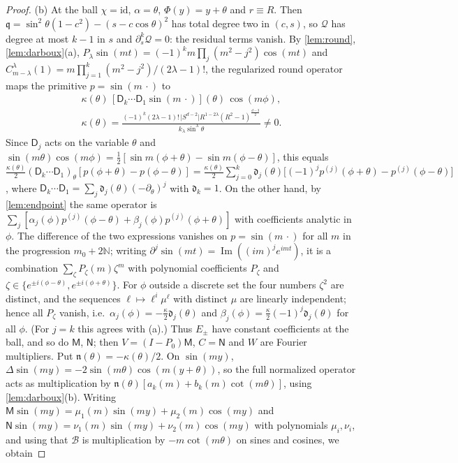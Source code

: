 \documentclass[11pt]{amsart}
\numberwithin{equation}{section}
\theoremstyle{definition}
\theoremstyle{remark}
\newcommand{\N}{\mathbb{N}}
\newcommand{\abs}[1]{\lvert #1\rvert}
\newcommand{\id}{\mathrm{id}}
\newcommand{\cB}{\mathcal B}
\begin{document}
\begin{proof}
(b) At the ball $\chi=\id$, $\alpha=\theta$, $\Phi(y)=y+\theta$ and $r\equiv R$. Then $\mathfrak q=\sin^2\theta(1-c^2)-(s-c\cos\theta)^2$ has total degree two in $(c,s)$, so $\mathcal Q$ has degree at most $k-1$ in $s$ and $\partial_s^k\mathcal Q=0$: the residual terms vanish. By \cref{lem:round}, \cref{lem:darboux}(a), $P_\lambda\sin(mt)=(-1)^km\prod_j(m^2-j^2)\cos(mt)$ and $C^\lambda_{m-\lambda}(1)=m\prod_{j=1}^k(m^2-j^2)/(2\lambda-1)!$, the regularized round operator maps the primitive $p=\sin(m\,\cdot)$ to
\begin{gather*}
\kappa(\theta)\,[\mathsf D_k\cdots\mathsf D_1\sin(m\,\cdot)](\theta)\,\cos(m\phi),\\
\kappa(\theta)=\frac{(-1)^k(2\lambda-1)!\,\abs{S^{d-2}}R^{1-2\lambda}(R^2-1)^{\frac{d-3}2}}{k_\lambda\sin^\lambda\theta}\ne0 .
\end{gather*}
Since $\mathsf D_j$ acts on the variable $\theta$ and $\sin(m\theta)\cos(m\phi)=\frac12[\sin m(\phi+\theta)-\sin m(\phi-\theta)]$, this equals $\frac{\kappa(\theta)}2(\mathsf D_k\cdots\mathsf D_1)_\theta[p(\phi+\theta)-p(\phi-\theta)]=\frac{\kappa(\theta)}2\sum_{j=0}^k\mathfrak d_j(\theta)\bigl[(-1)^jp^{(j)}(\phi+\theta)-p^{(j)}(\phi-\theta)\bigr]$, where $\mathsf D_k\cdots\mathsf D_1=\sum_j\mathfrak d_j(\theta)(-\partial_\theta)^j$ with $\mathfrak d_k=1$. On the other hand, by \cref{lem:endpoint} the same operator is $\sum_j[\alpha_j(\phi)p^{(j)}(\phi-\theta)+\beta_j(\phi)p^{(j)}(\phi+\theta)]$ with coefficients analytic in $\phi$. The difference of the two expressions vanishes on $p=\sin(m\,\cdot)$ for all $m$ in the progression $m_0+2\N$; writing $\partial^j\sin(mt)=\operatorname{Im}((im)^je^{imt})$, it is a combination $\sum_\zeta P_\zeta(m)\zeta^m$ with polynomial coefficients $P_\zeta$ and $\zeta\in\{e^{\pm i(\phi-\theta)},e^{\pm i(\phi+\theta)}\}$. For $\phi$ outside a discrete set the four numbers $\zeta^2$ are distinct, and the sequences $\ell\mapsto\ell^i\mu^\ell$ with distinct $\mu$ are linearly independent; hence all $P_\zeta$ vanish, i.e.\ $\alpha_j(\phi)=-\frac{\kappa}2\mathfrak d_j(\theta)$ and $\beta_j(\phi)=\frac\kappa2(-1)^j\mathfrak d_j(\theta)$ for all $\phi$. (For $j=k$ this agrees with (a).) Thus $E_\pm$ have constant coefficients at the ball, and so do $\mathsf M$, $\mathsf N$; then $V=(I-P_0)\mathsf M$, $C=\mathsf N$ and $W$ are Fourier multipliers. Put $\mathfrak n(\theta)=-\kappa(\theta)/2$. On $\sin(my)$, $\Delta\sin(my)=-2\sin(m\theta)\cos(m(y+\theta))$, so the full normalized operator acts as multiplication by $\mathfrak n(\theta)[a_k(m)+b_k(m)\cot(m\theta)]$, using \cref{lem:darboux}(b). Writing $\mathsf M\sin(my)=\mu_1(m)\sin(my)+\mu_2(m)\cos(my)$ and $\mathsf N\sin(my)=\nu_1(m)\sin(my)+\nu_2(m)\cos(my)$ with polynomials $\mu_i,\nu_i$, and using that $\cB$ is multiplication by $-m\cot(m\theta)$ on sines and cosines, we obtain

\end{proof}
\end{document}
